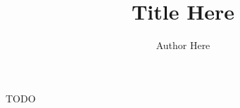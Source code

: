 \documentclass[12pt,twocolumn]{article}
\begin{document}
\title{Title Here}
\author{Author Here}
\date{}
\maketitle

TODO
\end{document}
